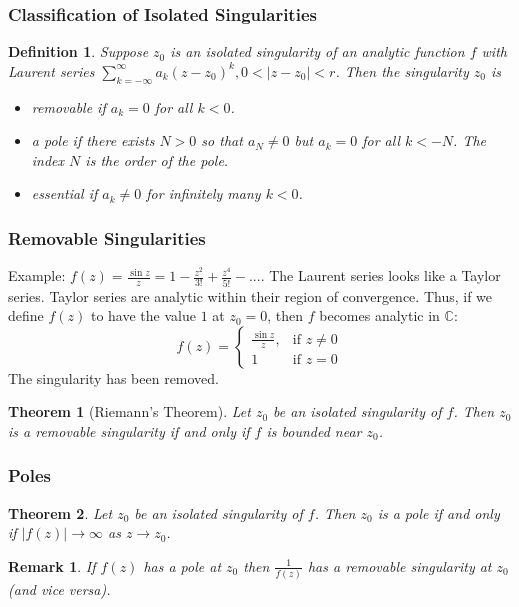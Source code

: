 \documentclass{article}
\newtheorem{theorem}{Theorem}[section]
\newtheorem*{remark}{Remark}
\newtheorem{definition}{Definition}[section]
\begin{document}
\subsubsection{Classification of Isolated Singularities}
\begin{definition}
Suppose $z_0$ is an isolated singularity of an analytic function $f$ with Laurent series $\sum_{k=-\infty}^{\infty} a_k(z - z_0)^k, 0 < \left|z - z_0\right| < r$. Then the singularity $z_0$ is
\begin{itemize}
\item removable if $a_k = 0$ for all $k < 0$.
\item a pole if there exists $N > 0$ so that $a_{N} \neq 0$ but $a_k = 0$ for all $k < -N$. The index $N$ is the order of the pole.
\item essential if $a_k \neq 0$ for infinitely many $k < 0$.
\end{itemize}
\end{definition}

\subsubsection{Removable Singularities}
Example: $f(z) = \frac{\sin z}{z} = 1 - \frac{z^2}{3!} + \frac{z^4}{5!} - ...$. The Laurent series looks like a Taylor series. Taylor series are analytic within their region of convergence. Thus, if we define $f(z)$ to have the value $1$ at $z_0 = 0$, then $f$ becomes analytic in $\mathbb{C}$: \\
$$
f(z) =  
\begin{cases} \frac{\sin z}{z}, &\mbox{if } z \neq 0 \\
1 &\mbox{if } z = 0 
\end{cases}
$$
The singularity has been removed.
\begin{theorem}[Riemann's Theorem]
Let $z_0$ be an isolated singularity of $f$. Then $z_0$ is a removable singularity if and only if $f$ is bounded near $z_0$.
\end{theorem}

\subsubsection{Poles}
\begin{theorem}
Let $z_0$ be an isolated singularity of $f$. Then $z_0$ is a pole if and only if $\left|f(z)\right| \to \infty$ as $z \to z_0$.
\end{theorem}
\begin{remark}
If $f(z)$ has a pole at $z_0$ then $\frac{1}{f(z)}$ has a removable singularity at $z_0$ (and vice versa).
\end{remark}
\end{document}
